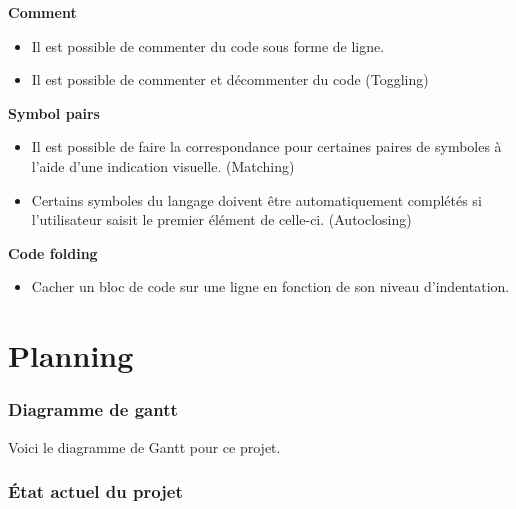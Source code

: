 \documentclass[
    iict, %
    il, %
]{heig-tb}
\begin{document}

\textbf{Comment}
\begin{itemize}
    \item Il est possible de commenter du code sous forme de ligne.
    \item Il est possible de commenter et décommenter du code (Toggling)
\end{itemize}

\textbf{Symbol pairs}
\begin{itemize}
    \item Il est possible de faire la correspondance pour certaines paires de symboles à l'aide d'une indication visuelle. (Matching)
    \item Certains symboles du langage doivent être automatiquement complétés si l'utilisateur saisit le premier élément de celle-ci. (Autoclosing)
\end{itemize}

\textbf{Code folding}
\begin{itemize}
    \item Cacher un bloc de code sur une ligne en fonction de son niveau d'indentation.
\end{itemize}


\chapter{Planning}


\subsection{Diagramme de gantt}
Voici le diagramme de Gantt pour ce projet.



\subsection{État actuel du projet}
\end{document}
